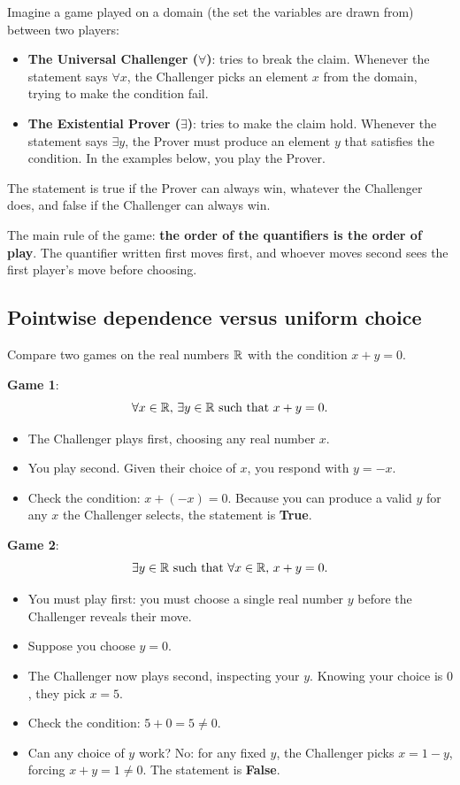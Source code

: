 Imagine a game played on a domain (the set the variables are drawn from) between two players:
\begin{itemize}
\item \textbf{The Universal Challenger ($\forall$)}: tries to break the claim. Whenever the statement says $\forall x$, the Challenger picks an element $x$ from the domain, trying to make the condition fail.
\item \textbf{The Existential Prover ($\exists$)}: tries to make the claim hold. Whenever the statement says $\exists y$, the Prover must produce an element $y$ that satisfies the condition. In the examples below, you play the Prover.
\end{itemize}
The statement is true if the Prover can always win, whatever the Challenger does, and false if the Challenger can always win.

The main rule of the game: \textbf{the order of the quantifiers is the order of play}. The quantifier written first moves first, and whoever moves second sees the first player's move before choosing.

\subsection{Pointwise dependence versus uniform choice}

Compare two games on the real numbers $\mathbb{R}$ with the condition $x + y = 0$.

\textbf{Game 1}:
\[
\forall x \in \mathbb{R}, \, \exists y \in \mathbb{R} \text{ such that } x + y = 0.
\]
\begin{itemize}
\item The Challenger plays first, choosing any real number $x$.
\item You play second. Given their choice of $x$, you respond with $y = -x$.
\item Check the condition: $x + (-x) = 0$. Because you can produce a valid $y$ for any $x$ the Challenger selects, the statement is \textbf{True}.
\end{itemize}

\textbf{Game 2}:
\[
\exists y \in \mathbb{R} \text{ such that } \forall x \in \mathbb{R}, \, x + y = 0.
\]
\begin{itemize}
\item You must play first: you must choose a single real number $y$ before the Challenger reveals their move.
\item Suppose you choose $y = 0$.
\item The Challenger now plays second, inspecting your $y$. Knowing your choice is $0$, they pick $x = 5$.
\item Check the condition: $5 + 0 = 5 \neq 0$.
\item Can any choice of $y$ work? No: for any fixed $y$, the Challenger picks $x = 1 - y$, forcing $x + y = 1 \neq 0$. The statement is \textbf{False}.
\end{itemize}

